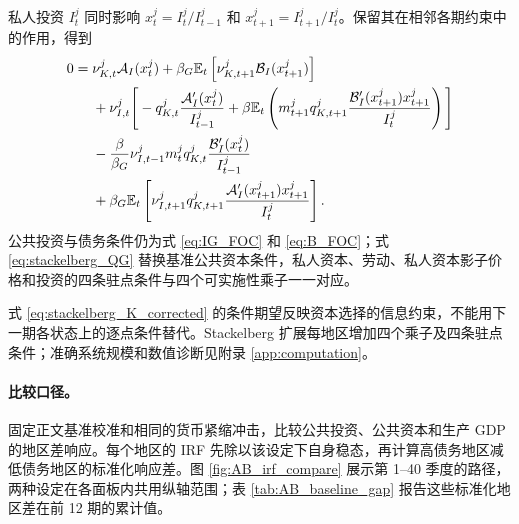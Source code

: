 \documentclass[12pt,UTF8]{ctexart}
\newcommand{\E}{\mathbb{E}}
\begin{document}
	私人投资 $I_t^j$ 同时影响 $x_t^j=I_t^j/I_{t-1}^j$ 和 $x_{t+1}^j=I_{t+1}^j/I_t^j$。保留其在相邻各期约束中的作用，得到
	\begin{align}
		0={}&\nu_{K,t}^j\mathcal A_I(x_t^j)
		+\beta_G\E_t\left[\nu_{K,t+1}^j\mathcal B_I(x_{t+1}^j)\right] \notag\\
		&+\nu_{I,t}^j\Bigg[
		-q_{K,t}^j\frac{\mathcal A_I'(x_t^j)}{I_{t-1}^j}
		+\beta \E_t\left(
		m_{t+1}^j q_{K,t+1}^j
		\frac{\mathcal B_I'(x_{t+1}^j)x_{t+1}^j}{I_t^j}
		\right)\Bigg] \notag\\
		&-\frac{\beta}{\beta_G}\nu_{I,t-1}^jm_t^j q_{K,t}^j
		\frac{\mathcal B_I'(x_t^j)}{I_{t-1}^j} \notag\\
		&+\beta_G\E_t\left[
		\nu_{I,t+1}^j q_{K,t+1}^j
		\frac{\mathcal A_I'(x_{t+1}^j)x_{t+1}^j}{I_t^j}
		\right].
		\label{eq:stackelberg_I}
	\end{align}
	公共投资与债务条件仍为式 \eqref{eq:IG_FOC} 和 \eqref{eq:B_FOC}；式 \eqref{eq:stackelberg_QG} 替换基准公共资本条件，私人资本、劳动、私人资本影子价格和投资的四条驻点条件与四个可实施性乘子一一对应。
	
	式 \eqref{eq:stackelberg_K_corrected} 的条件期望反映资本选择的信息约束，不能用下一期各状态上的逐点条件替代。Stackelberg 扩展每地区增加四个乘子及四条驻点条件；准确系统规模和数值诊断见附录 \ref{app:computation}。
	
	\paragraph{比较口径。}
	固定正文基准校准和相同的货币紧缩冲击，比较公共投资、公共资本和生产 GDP 的地区差响应。每个地区的 IRF 先除以该设定下自身稳态，再计算高债务地区减低债务地区的标准化响应差。图 \ref{fig:AB_irf_compare} 展示第 1--40 季度的路径，两种设定在各面板内共用纵轴范围；表 \ref{tab:AB_baseline_gap} 报告这些标准化地区差在前 12 期的累计值。
	
\end{document}
